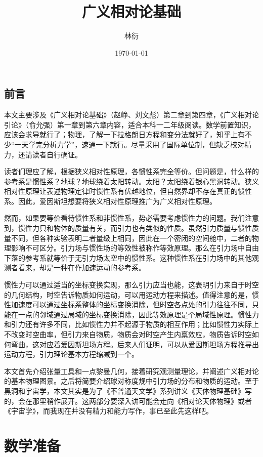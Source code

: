\documentclass[11pt, a4paper, oneside, onecolumn]{ctexart}
\title{广义相对论基础}
\author{林衍}
\date{\today}
\numberwithin{equation}{subsection}
\begin{document}
\maketitle
\subsection*{前言}
本文主要涉及《广义相对论基础》（赵峥、刘文彪）第二章到第四章，《广义相对论引论》（俞允强）第一章到第六章内容，适合本科一二年级阅读。数学前置知识，应该会求导就行了；物理，了解一下拉格朗日方程和变分法就好了，知乎上有不少“一天学完分析力学”，速通一下就行。尽量采用了国际单位制，但缺乏校对精力，还请读者自行确证。

读者们理应了解，根据狭义相对性原理，各惯性系完全等价。但问题是，什么样的参考系是惯性系？地球？地球绕着太阳转动。太阳？太阳绕着银心黑洞转动。狭义相对性原理让表述物理定律时惯性系有优越地位，但自然界却不存在真正的惯性系。因此，爱因斯坦想要将狭义相对性原理推广为广义相对性原理。

然而，如果要等价看待惯性系和非惯性系，势必需要考虑惯性力的问题。我们注意到，惯性力只和物体的质量有关，而引力也有类似的性质。虽然引力质量与惯性质量不同，但各种实验表明二者量级上相同，因此在一个密闭的空间舱中，二者的物理影响不可区分。引力场与惯性场的等效性被称作等效原理。那么在引力场中自由下落的参考系就等价于无引力场太空中的惯性系。这种惯性系在引力场中的其他观测者看来，却是一种在作加速运动的参考系。

惯性力可以通过适当的坐标变换实现，那么引力应当也能，这表明引力来自于时空的几何结构，时空告诉物质如何运动，可以用运动方程来描述。值得注意的是，惯性加速度可以通过坐标系整体的坐标变换消除，但时空各点处的引力往往不同，只能在一点的邻域通过局域的坐标变换消除，因此等效原理是个局域性原理。惯性力和引力还有许多不同，比如惯性力并不起源于物质的相互作用；比如惯性力实际上不改变时空曲率，但引力来自物质，物质会对时空产生内禀效应，物质告诉时空如何弯曲，这对应着爱因斯坦场方程。后来人们证明，可以从爱因斯坦场方程推导出运动方程，引力理论基本方程缩减到一个。

本文首先介绍张量工具和一点黎曼几何，接着研究观测量理论，并阐述广义相对论的基本物理图景。之后将简要介绍球对称度规中引力场的分布和物质的运动。至于黑洞和宇宙学，本文其实是为了《不普通天文学》系列讲义《天体物理基础》写的，会在那里稍作展开。这两部分要深入讲可能会走向《相对论天体物理》或者《宇宙学》，而我现在并没有精力和能力写作，事已至此先这样吧。

\newpage
\tableofcontents

\newpage
\section{数学准备}
\end{document}

